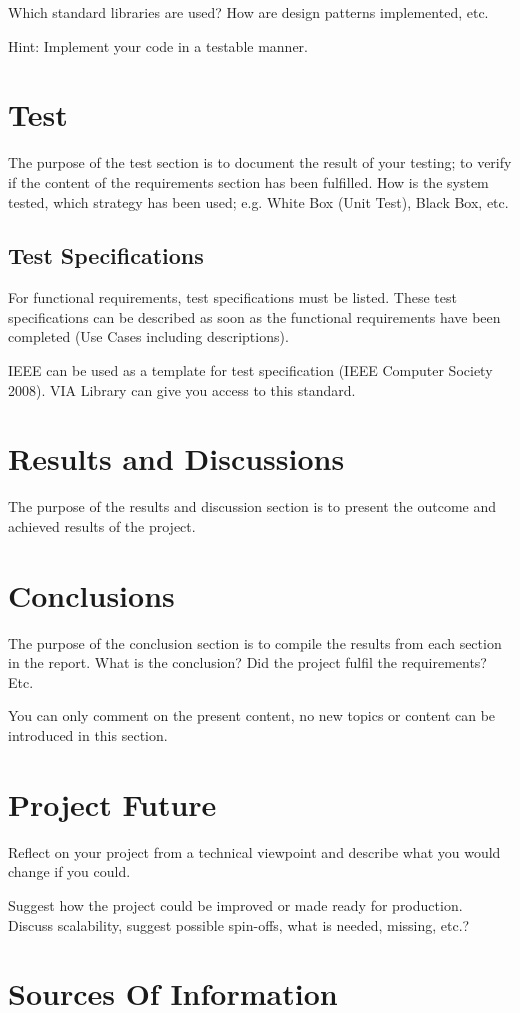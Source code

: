 \documentclass{article}
\begin{document}
	Which standard libraries are used? How are design patterns implemented, etc.
	
	Hint: Implement your code in a testable manner.
	\newpage
	\section{Test}
	The purpose of the test section is to document the result of your testing; to verify if the content of the requirements section has been fulfilled. How is the system tested, which strategy has been used; e.g. White Box (Unit Test), Black Box, etc.
	\subsection{Test Specifications}
	For functional requirements, test specifications must be listed. These test specifications can be described as soon as the functional requirements have been completed (Use Cases including descriptions).
	
	IEEE can be used as a template for test specification (IEEE Computer Society 2008). VIA Library can give you access to this standard.
	\newpage
	\section{Results and Discussions}
	The purpose of the results and discussion section is to present the outcome and achieved results of the project.
	\newpage
	\section{Conclusions}
	The purpose of the conclusion section is to compile the results from each section in the report. What is the conclusion? Did the project fulfil the requirements? Etc.
	
	You can only comment on the present content, no new topics or content can be introduced in this section.
	\newpage
	\section{Project Future}
	Reflect on your project from a technical viewpoint and describe what you would change if you could.
	
	Suggest how the project could be improved or made ready for production. Discuss scalability, suggest possible spin-offs, what is needed, missing, etc.?
	\newpage
	\section{Sources Of Information}
	
\end{document}
